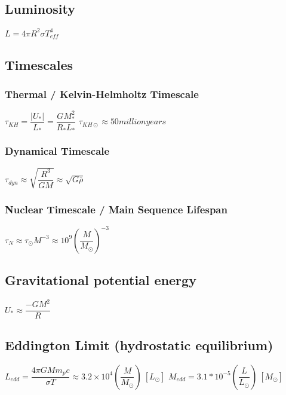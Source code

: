 	\subsection{Luminosity}
\begin{itemize}
\itemt \( L = 4\pi R^2 \sigma T_{eff}^4 \)
\end{itemize}
    
    \subsection{Timescales}

\subsubsection{Thermal / Kelvin-Helmholtz Timescale}
\begin{itemize}
\itemt \( \tau_{KH} = \dfrac{|U_*|}{L_*} = \dfrac{GM_*^2}{R_*L_*} \)
\itemt \( \tau_{KH\odot} \approx 50 million years \)
\end{itemize}

\subsubsection{Dynamical Timescale}
\begin{itemize}
\itemt \( \tau_{dyn} \approx \sqrt{\dfrac{R^3}{GM}} \approx \sqrt{G\bar{\rho}} \)
\end{itemize}

\subsubsection{Nuclear Timescale / Main Sequence Lifespan}
\begin{itemize}
\itemt \( \tau_N \approx \tau_{\odot}M^{-3} \approx 10^9 (\dfrac{M}{M_{\odot}})^{-3} \)
\end{itemize}


		\subsection{Gravitational potential energy}
\begin{itemize}
\itemt \( U_* \approx \dfrac{-GM^2}{R} \)
\end{itemize}

		\subsection{Eddington Limit (hydrostatic equilibrium)}
\begin{itemize}
\itemt \( L_{edd} = \dfrac{4\pi G M m_p c}{\sigma T} \approx 3.2 \times 10^4 (\dfrac{M}{M_\odot})\ [L_\odot] \)
\itemt \( M_{edd} = 3.1*10^{-5} (\dfrac{L}{L_\odot})\ [M_\odot] \)
\end{itemize}

